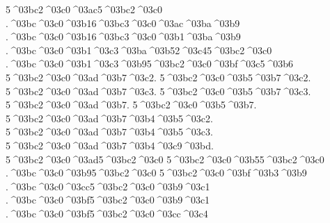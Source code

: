 {5^^^^03bc2^^^^03c0^^^^03ac5^^^^03bc2^^^^03c0   %
  .^^^^03bc^^^^03c0^^^^03b16^^^^03bc3^^^^03c0^^^^03ac^^^^03ba^^^^03b9 %
  .^^^^03bc^^^^03c0^^^^03b16^^^^03bc3^^^^03c0^^^^03b1^^^^03ba^^^^03b9
.^^^^03bc^^^^03c0^^^^03b1^^^^03c3^^^^03ba^^^^03b52^^^^03c45^^^^03bc2^^^^03c0  %
.^^^^03bc^^^^03c0^^^^03b1^^^^03c3^^^^03b95^^^^03bc2^^^^03c0^^^^03bf^^^^03c5^^^^03b6 %
5^^^^03bc2^^^^03c0^^^^03ad^^^^03b7^^^^03c2.    %
5^^^^03bc2^^^^03c0^^^^03b5^^^^03b7^^^^03c2.
5^^^^03bc2^^^^03c0^^^^03ad^^^^03b7^^^^03c3.
5^^^^03bc2^^^^03c0^^^^03b5^^^^03b7^^^^03c3.
5^^^^03bc2^^^^03c0^^^^03ad^^^^03b7.
5^^^^03bc2^^^^03c0^^^^03b5^^^^03b7.
5^^^^03bc2^^^^03c0^^^^03ad^^^^03b7^^^^03b4^^^^03b5^^^^03c2.
5^^^^03bc2^^^^03c0^^^^03ad^^^^03b7^^^^03b4^^^^03b5^^^^03c3.
5^^^^03bc2^^^^03c0^^^^03ad^^^^03b7^^^^03b4^^^^03c9^^^^03bd.
5^^^^03bc2^^^^03c0^^^^03ad5^^^^03bc2^^^^03c0   %
5^^^^03bc2^^^^03c0^^^^03b55^^^^03bc2^^^^03c0
.^^^^03bc^^^^03c0^^^^03b95^^^^03bc2^^^^03c0     %
5^^^^03bc2^^^^03c0^^^^03bf^^^^03b3^^^^03b9      %
.^^^^03bc^^^^03c0^^^^03cc5^^^^03bc2^^^^03c0^^^^03b9^^^^03c1  %
.^^^^03bc^^^^03c0^^^^03bf5^^^^03bc2^^^^03c0^^^^03b9^^^^03c1   %
.^^^^03bc^^^^03c0^^^^03bf5^^^^03bc2^^^^03c0^^^^03cc^^^^03c4  %
}
